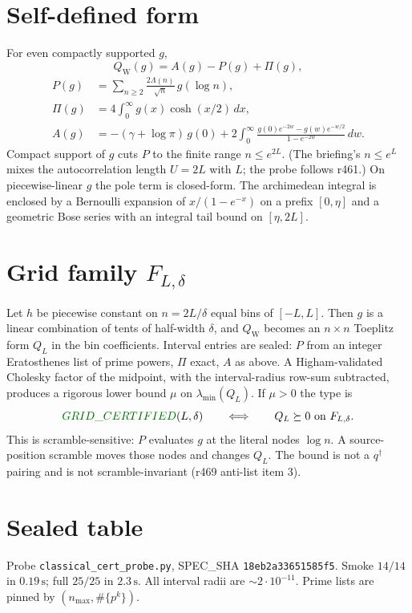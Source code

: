 \documentclass[11pt]{article}
\newcommand{\QW}{Q_{\mathrm W}}
\newcommand{\cert}{\textcolor{green!40!black}{GRID\_CERTIFIED}}
\begin{document}
\section{Self-defined form}

For even compactly supported $g$,
\[
 \QW(g)=A(g)-P(g)+\Pi(g),
\]
\begin{align*}
 P(g)&=\sum_{n\ge 2}\frac{2\Lambda(n)}{\sqrt n}\,g(\log n),\\
 \Pi(g)&=4\int_0^\infty g(x)\cosh(x/2)\,dx,\\
 A(g)&=-(\gamma+\log\pi)\,g(0)
  +2\int_0^\infty\frac{g(0)e^{-2w}-g(w)e^{-w/2}}{1-e^{-2w}}\,dw.
\end{align*}
Compact support of $g$ cuts $P$ to the finite range $n\le e^{2L}$.
(The briefing's $n\le e^L$ mixes the autocorrelation length $U=2L$
with $L$; the probe follows r461.)  On piecewise-linear $g$ the pole
term is closed-form.  The archimedean integral is enclosed by a
Bernoulli expansion of $x/(1-e^{-x})$ on a prefix $[0,\eta]$ and a
geometric Bose series with an integral tail bound on $[\eta,2L]$.

\section{Grid family $F_{L,\delta}$}

Let $h$ be piecewise constant on $n=2L/\delta$ equal bins of
$[-L,L]$.  Then $g$ is a linear combination of tents of half-width
$\delta$, and $\QW$ becomes an $n\times n$ Toeplitz form $Q_L$ in the
bin coefficients.  Interval entries are sealed: $P$ from an integer
Eratosthenes list of prime powers, $\Pi$ exact, $A$ as above.
A Higham-validated Cholesky factor of the midpoint, with the
interval-radius row-sum subtracted, produces a rigorous lower bound
$\mu$ on $\lambda_{\min}(Q_L)$.  If $\mu>0$ the type is
\[
 \cert(L,\delta)\qquad\Longleftrightarrow\qquad
 Q_L\succeq 0\text{ on }F_{L,\delta}.
\]
This is scramble-sensitive: $P$ evaluates $g$ at the literal nodes
$\log n$.  A source-position scramble moves those nodes and changes
$Q_L$.  The bound is not a $q^\dagger$ pairing and is not
scramble-invariant (r469 anti-list item 3).

\section{Sealed table}

Probe \texttt{classical\_cert\_probe.py},
SPEC\_SHA \texttt{18eb2a33651585f5}.
Smoke $14/14$ in $0.19\,\mathrm{s}$; full $25/25$ in $2.3\,\mathrm{s}$.
All interval radii are $\sim 2\cdot 10^{-11}$.
Prime lists are pinned by $(n_{\max},\#\{p^k\})$.
\end{document}
